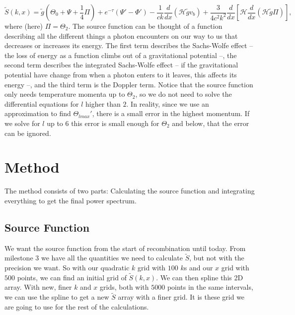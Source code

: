 \documentclass[a4paper,norsk, 10pt]{article}
\begin{document}
\begin{equation}\label{eq:S}
\tilde{S}(k,x) = \tilde{g}\left(\Theta_0 + \Psi + \frac{1}{4}\Pi\right) +e^{-\tau}\left(\Psi' - \Phi'\right)  - \frac{1}{ck}\frac{d}{dx}\left(\mathcal{H}\tilde{g}v_b\right) + \frac{3}{4c^2k^2}\frac{d}{dx}\left[\mathcal{H}\frac{d}{dx}\left(\mathcal{H}\tilde{g}\Pi\right) \right],
\end{equation}
where (here) $\Pi = \Theta_2$. The source function can be thought of a function describing all the different things a photon encounters on our way to us that decreases or increases its energy. The first term describes the Sachs-Wolfe effect -- the loss of energy as a function climbs out of a gravitational potential --, the second term describes the integrated Sachs-Wolfe effect -- if the gravitational potential have change from when a photon enters to it leaves, this affects its energy --, and the third term is the Doppler term. Notice that the source function only needs temperature momenta up to $\Theta_2$, so we do not need to solve the differential equations for $l$ higher than $2$. In reality, since we use an approximation to find $\Theta_{lmax}'$, there is a small error in the highest momentum. If we solve for $l$ up to $6$ this error is small enough for $\Theta_2$ and below, that the error can be ignored.


\section{Method}
The method consists of two parts: Calculating the source function and integrating everything to get the final power spectrum.

\subsection{Source Function}
We want the source function from the start of recombination until today. From milestone 3 we have all the quantities we need to calculate $\tilde{S}$, but not with the precision we want. So with our quadratic $k$ grid with $100$ $k$s and our $x$ grid with $500$ points, we can find an initial grid of $\tilde{S}(k,x)$. We can then spline this 2D array. With new, finer $k$ and $x$ grids, both with $5000$ points in the same intervals, we can use the spline to get a new $\tilde{S}$ array with a finer grid. It is these grid we are going to use for the rest of the calculations.
\end{document}
